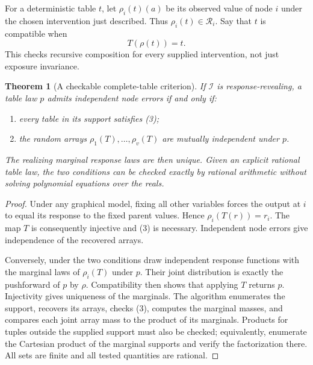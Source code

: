 \documentclass[11pt]{article}
\newtheorem{theorem}{Theorem}
\theoremstyle{remark}
\begin{document}
For a deterministic table $t$, let $\rho_i(t)(a)$ be its observed value of node $i$ under the chosen intervention just described. Thus $\rho_i(t)\in\mathcal R_i$. Say that $t$ is compatible when
\[
                     T(\rho(t))=t.\tag{3}
\]
This checks recursive composition for every supplied intervention, not just exposure invariance.

\begin{theorem}[A checkable complete-table criterion]\label{complete}
If $\mathcal I$ is response-revealing, a table law $p$ admits independent node errors if and only if:
\begin{enumerate}
\item every table in its support satisfies (3);
\item the random arrays $\rho_1(T),\ldots,\rho_v(T)$ are mutually independent under $p$.
\end{enumerate}
The realizing marginal response laws are then unique. Given an explicit rational table law, the two conditions can be checked exactly by rational arithmetic without solving polynomial equations over the reals.
\end{theorem}
\begin{proof}
Under any graphical model, fixing all other variables forces the output at $i$ to equal its response to the fixed parent values. Hence $\rho_i(T(r))=r_i$. The map $T$ is consequently injective and (3) is necessary. Independent node errors give independence of the recovered arrays.

Conversely, under the two conditions draw independent response functions with the marginal laws of $\rho_i(T)$ under $p$. Their joint distribution is exactly the pushforward of $p$ by $\rho$. Compatibility then shows that applying $T$ returns $p$. Injectivity gives uniqueness of the marginals. The algorithm enumerates the support, recovers its arrays, checks (3), computes the marginal masses, and compares each joint array mass to the product of its marginals. Products for tuples outside the supplied support must also be checked; equivalently, enumerate the Cartesian product of the marginal supports and verify the factorization there. All sets are finite and all tested quantities are rational.
\end{proof}
\end{document}
